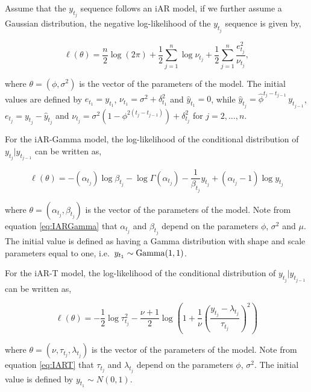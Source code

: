 Assume that the \(y_{t_j}\) sequence follows an iAR model, if we further assume a Gaussian distribution, the negative log-likelihood of the \(y_{t_j}\) sequence is given by,

\begin{equation}
\ell(\theta)=\frac{n}{2}\log (2\pi)+\frac{1}{2}\sum_{j=1}^n \log \nu_{t_j} + \frac{1}{2}\sum_{j=1}^n \frac{e_{t_j}^2}{\nu_{t_j}},
\label{eq:IARloglik}
\end{equation}

where \(\theta = (\phi, \sigma^2)\) is the vector of the parameters of the model. The initial values are defined by \(e_{t_1}=y_{t_1}\), \(\nu_{t_1}=\sigma^2 + \delta_{t_1}^2\) and \(\hat{y}_{t_1}=0\), while \(\hat{y}_{t_j} = \hat{\phi}^{t_j-t_{j-1}}\, y_{t_{j-1}}\), \(e_{t_j}=y_{t_j}-\hat{y}_{t_j}\) and \(\nu_{t_j}=\sigma^2 (1-\phi^{2(t_j-t_{j-1})}) + \delta_{t_j}^2\) for \(j=2,\ldots,n\).

For the iAR-Gamma model, the log-likelihood of the conditional distribution of \(y_{t_j}|y_{t_{j-1}}\) can be written as,

\begin{equation}
\ell(\theta) = - \left(\alpha_{t_j}\right) \log \beta_{t_j} - \log \Gamma \left(\alpha_{t_j}\right) - \frac{1}{\beta_{t_j}}y_{t_j} + \left(\alpha_{t_j}-1\right) \log y_{t_j} 
\label{eq:IARGammaloglik}
\end{equation}

where \(\theta = (\alpha_{t_j}, \beta_{t_j})\) is the vector of the parameters of the model. Note from equation \eqref{eq:IARGamma} that \(\alpha_{t_j}\) and \(\beta_{t_j}\) depend on the parameters \(\phi\), \(\sigma^2\) and \(\mu\). The initial value is defined as having a Gamma distribution with shape and scale parameters equal to one, i.e.~\(y_{t_1} \sim {\rm Gamma}(1,1)\).

For the iAR-T model, the log-likelihood of the conditional distribution of \(y_{t_j}|y_{t_{j-1}}\) can be written as,

\begin{equation}
\ell(\theta) = - \frac{1}{2}  \log \tau_{t_j}^2 -\frac{\nu+1}{2}  \log    \left( 1 + \frac{1}{\nu} \left(\frac{y_{t_j}-\lambda_{t_j}}{\tau_{t_j}} \right)^2 \right)
\label{eq:IARTloglik}
\end{equation}

where \(\theta = (\nu, \tau_{t_j}, \lambda_{t_j})\) is the vector of the parameters of the model. Note from equation \eqref{eq:IART} that \(\tau_{t_j}\) and \(\lambda_{t_j}\) depend on the parameters \(\phi\), \(\sigma^2\). The initial value is defined by \(y_{t_1} \sim N(0,1)\).

